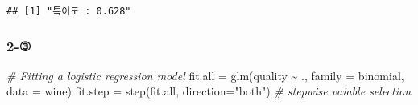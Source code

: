 \documentclass[
]{article}
\newenvironment{Shaded}{\begin{snugshade}}{\end{snugshade}}
\newcommand{\AttributeTok}[1]{\textcolor[rgb]{0.77,0.63,0.00}{#1}}
\newcommand{\CommentTok}[1]{\textcolor[rgb]{0.56,0.35,0.01}{\textit{#1}}}
\newcommand{\FunctionTok}[1]{\textcolor[rgb]{0.00,0.00,0.00}{#1}}
\newcommand{\NormalTok}[1]{#1}
\newcommand{\OtherTok}[1]{\textcolor[rgb]{0.56,0.35,0.01}{#1}}
\newcommand{\SpecialCharTok}[1]{\textcolor[rgb]{0.00,0.00,0.00}{#1}}
\newcommand{\StringTok}[1]{\textcolor[rgb]{0.31,0.60,0.02}{#1}}
\begin{document}
\begin{verbatim}
## [1] "특이도 : 0.628"
\end{verbatim}

\hypertarget{section-4}{%
\subsubsection{2-③}\label{section-4}}

\begin{Shaded}
\begin{Highlighting}[]
\CommentTok{\# Fitting a logistic regression model}
\NormalTok{fit.all }\OtherTok{=} \FunctionTok{glm}\NormalTok{(quality }\SpecialCharTok{\textasciitilde{}}\NormalTok{ ., }\AttributeTok{family =}\NormalTok{ binomial, }\AttributeTok{data =}\NormalTok{ wine)}
\NormalTok{fit.step }\OtherTok{=} \FunctionTok{step}\NormalTok{(fit.all, }\AttributeTok{direction=}\StringTok{"both"}\NormalTok{) }\CommentTok{\# stepwise vaiable selection}
\end{Highlighting}
\end{Shaded}
\end{document}
